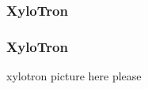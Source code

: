 \documentclass{presentation}
\begin{document}
\begin{frame}\frametitle{XyloTron}
\end{frame}

\begin{frame}\frametitle{XyloTron}
  xylotron picture here please
\end{frame}
\end{document}

